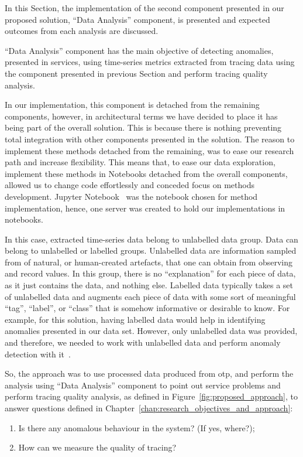 In this Section, the implementation of the second component presented in our proposed solution, ``Data Analysis'' component, is presented and expected outcomes from each analysis are discussed.

``Data Analysis'' component has the main objective of detecting anomalies, presented in services, using time-series metrics extracted from tracing data using the component presented in previous Section and perform tracing quality analysis.

In our implementation, this component is detached from the remaining components, however, in architectural terms we have decided to place it has being part of the overall solution. This is because there is nothing preventing total integration with other components presented in the solution. The reason to implement these methods detached from the remaining, was to ease our research path and increase flexibility. This means that, to ease our data exploration, implement these methods in Notebooks detached from the overall components, allowed us to change code effortlessly and conceded focus on methods development. Jupyter Notebook~\cite{jupyter_notebooks} was the notebook chosen for method implementation, hence, one server was created to hold our implementations in notebooks.

In this case, extracted time-series data belong to unlabelled data group. Data can belong to unlabelled or labelled groups. Unlabelled data are information sampled from of natural, or human-created artefacts, that one can obtain from observing and record values. In this group, there is no ``explanation'' for each piece of data, as it just contains the data, and nothing else. Labelled data typically takes a set of unlabelled data and augments each piece of data with some sort of meaningful ``tag'', ``label'', or ``class'' that is somehow informative or desirable to know. For example, for this solution, having labelled data would help in identifying anomalies presented in our data set. However, only unlabelled data was provided, and therefore, we needed to work with unlabelled data and perform anomaly detection with it~\cite{Kothari}.

So, the approach was to use processed data produced from \gls{otp}, and perform the analysis using ``Data Analysis'' component to point out service problems and perform tracing quality analysis, as defined in Figure~\ref{fig:proposed_approach}, to answer questions defined in Chapter~\ref{chap:research_objectives_and_approach}:

\begin{enumerate}
    \item Is there any anomalous behaviour in the system? (If yes, where?);
    \item How can we measure the quality of tracing?
\end{enumerate}

